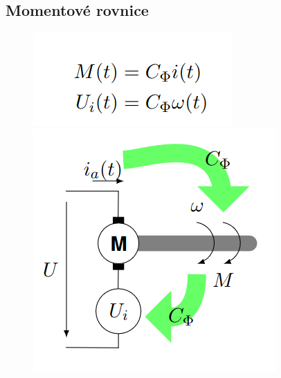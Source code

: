 \subsection{Momentové rovnice}
\begin{figure}[h!]
    \centering
    \begin{minipage}[b]{0.4\textwidth}
        \includegraphics[width = \textwidth]{img/MomRov.png}
    \end{minipage}
    \hfill
    \begin{minipage}[b]{0.4\textwidth}
        \includegraphics[width = \textwidth]{img/MomRovSchema.png}
    \end{minipage}
\end{figure}
